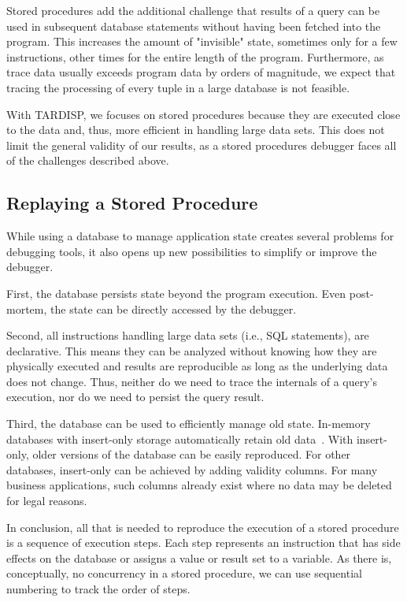 \documentclass[english,conference]{IEEEtran}
\newcommand{\todo}[2][]{\pdfmargincomment[author={#1}]{#2}}
\newcommand{\tool}{TAR\-DISP}
\begin{document}
Stored procedures add the additional challenge that results of a query can be used in subsequent database statements without having been fetched into the program.
This increases the amount of "invisible" state, sometimes only for a few instructions, other times for the entire length of the program.
Furthermore, as trace data usually exceeds program data by orders of magnitude, we expect that tracing the processing of every tuple in a large database is not feasible.

With \tool, we focuses on stored procedures because they are executed close to the data and, thus, more efficient in handling large data sets.
This does not limit the general validity of our results, as a stored procedures debugger faces all of the challenges described above.

\subsection{Replaying a Stored Procedure}

While using a database to manage application state creates several problems for debugging tools, it also opens up new possibilities to simplify or improve the debugger.

First, the database persists state beyond the program execution.
Even post-mortem, the state can be directly accessed by the debugger.

Second, all instructions handling large data sets (i.e., SQL statements), are declarative.
This means they can be analyzed without knowing how they are physically executed and results are reproducible as long as the underlying data does not change.
Thus, neither do we need to trace the internals of a query's execution, nor do we need to persist the query result.
\todo{MP: This is not clear to me, yet.}

Third, the database can be used to efficiently manage old state.
In-memory databases with insert-only storage automatically retain old data~\cite{Plattner2009Acd}.
With insert-only, older versions of the database can be easily reproduced.
For other databases, insert-only can be achieved by adding validity columns.
For many business applications, such columns already exist where no data may be deleted for legal reasons.

In conclusion, all that is needed to reproduce the execution of a stored procedure is a sequence of execution steps.
Each step represents an instruction that has side effects on the database or assigns a value or result set to a variable.
As there is, conceptually, no concurrency in a stored procedure, we can use sequential numbering to track the order of steps.
\end{document}
